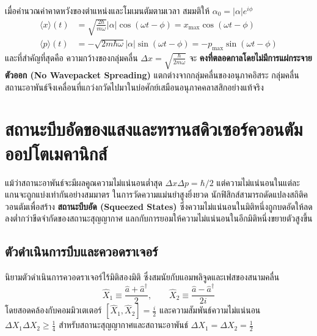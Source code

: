 เมื่อคำนวณค่าคาดหวังของตำแหน่งและโมเมนตัมตามเวลา สมมติให้ $\alpha_0 = |\alpha|e^{i\phi}$
\begin{align}
\langle x \rangle(t) &= \sqrt{\frac{2\hbar}{m\omega}} |\alpha| \cos(\omega t - \phi) = x_{\max} \cos(\omega t - \phi) \\
\langle p \rangle(t) &= -\sqrt{2m\hbar\omega} |\alpha| \sin(\omega t - \phi) = -p_{\max} \sin(\omega t - \phi)
\end{align}
และที่สำคัญที่สุดคือ ความกว้างของกลุ่มคลื่น $\Delta x = \sqrt{\frac{\hbar}{2m\omega}}$ จะ \textbf{คงที่ตลอดกาลโดยไม่มีการแผ่กระจายตัวออก (No Wavepacket Spreading)} แตกต่างจากกลุ่มคลื่นของอนุภาคอิสระ กลุ่มคลื่นสถานะอาพันธ์จึงเคลื่อนที่แกว่งกวัดไปมาในบ่อศักย์เสมือนอนุภาคคลาสสิกอย่างแท้จริง

\section{สถานะบีบอัดของแสงและทรานสดิวเซอร์ควอนตัมออปโตเมคานิกส์}
\label{sec_squeezed_states_optomechanics}

แม้ว่าสถานะอาพันธ์จะมีผลคูณความไม่แน่นอนต่ำสุด $\Delta x \Delta p = \hbar/2$ แต่ความไม่แน่นอนในแต่ละแกนจะถูกแบ่งเท่ากันอย่างสมมาตร ในการวัดความแม่นยำสูงยิ่งยวด นักฟิสิกส์สามารถดัดแปลงสถิติควอนตัมเพื่อสร้าง \textbf{สถานะบีบอัด (Squeezed States)} ซึ่งความไม่แน่นอนในมิติหนึ่งถูกบดอัดให้ลดลงต่ำกว่าขีดจำกัดของสถานะสุญญากาศ แลกกับการยอมให้ความไม่แน่นอนในอีกมิติหนึ่งขยายตัวสูงขึ้น

\subsection{ตัวดำเนินการบีบและควอดราเจอร์}
นิยามตัวดำเนินการควอดราเจอร์ไร้มิติสองมิติ ซึ่งสมนัยกับแอมพลิจูดและเฟสของสนามคลื่น
\begin{equation}
\hat{X}_1 \equiv \frac{\hat{a} + \hat{a}^\dagger}{2}, \qquad \hat{X}_2 \equiv \frac{\hat{a} - \hat{a}^\dagger}{2i}
\end{equation}
โดยสอดคล้องกับคอมมิวเตเตอร์ $[\hat{X}_1, \hat{X}_2] = \frac{i}{2}$ และความสัมพันธ์ความไม่แน่นอน $\Delta X_1 \Delta X_2 \ge \frac{1}{4}$
สำหรับสถานะสุญญากาศและสถานะอาพันธ์ $\Delta X_1 = \Delta X_2 = \frac{1}{2}$

